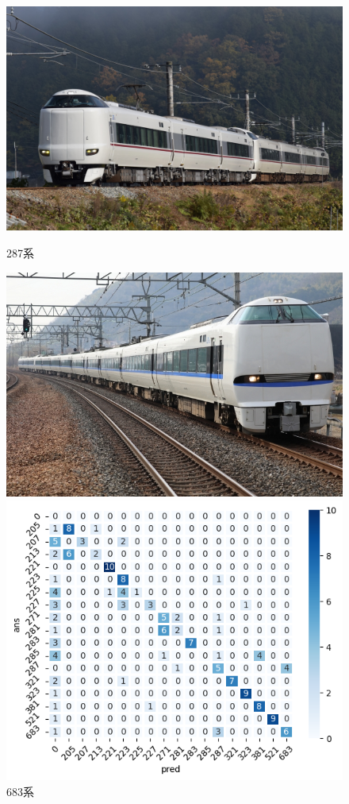 \newpage
\begin{figure}[htbp]
	\centering
	\begin{minipage}[b]{0.25\linewidth}
		\centering
		\includegraphics[width=\linewidth]{fig/287.jpg}
		\caption{287系}
		\includegraphics[width=\linewidth]{fig/683.jpg}
		\caption{683系}
	\end{minipage}
    \begin{minipage}[b]{0.5\linewidth}
		\centering
		\includegraphics[width=\linewidth]{../paper/chap4/fig/predicted_results}

\end{minipage}
\end{figure}
